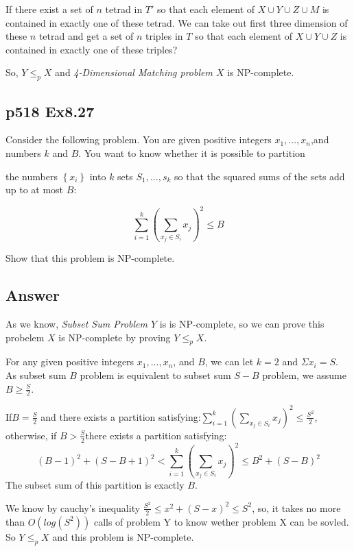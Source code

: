 \documentclass[a4paper]{article}
\begin{document}
If there exist a set of $n$ tetrad in $T'$ so that each element of $X \cup Y \cup Z \cup M$ is contained in exactly one of these tetrad. We can take out first three dimension of these $n$ tetrad and get a set of $n$ triples in $T$ so that each element of $X \cup Y \cup Z$ is contained in exactly one of these triples?

So, $Y\leq_pX$ and \emph{4-Dimensional Matching problem $X$} is NP-complete.
\vspace{2cm}


\subsection*{p518 Ex8.27}
\begin{adjustwidth}{1cm}{1cm}
	Consider the following problem. You are given positive integers $x_1, . . . , x_n$,and numbers $k$ and $B$. You want to know whether it is possible to partition

	the numbers $\left\{x_{i}\right\}$ into $k$ sets $S_{1}, \ldots, s_{k}$ so that the squared sums of the sets add up to at most $B:$

	$$
		\sum_{i=1}^{k}\left(\sum_{x_{j} \in S_{i}} x_{j}\right)^{2} \leq B
	$$

	Show that this problem is NP-complete.
\end{adjustwidth}
\subsection*{Answer}
As we know, \emph{Subset Sum Problem $Y$} is is NP-complete, so we can prove this probelem $X$ is NP-complete by proving $Y\leq_pX$.

For any given positive integers $x_1, . . . , x_n$, and $B$, we can let $k=2$ and $\Sigma x_i = S$. As subset sum $B$ problem is equivalent to subset sum $S-B$ problem, we assume $B \geq \frac{S}{2}$.

If$B = \frac{S}{2}$ and there exists a partition satisfying:$\sum_{i=1}^{k}\left(\sum_{x_{j} \in S_{i}} x_{j}\right)^{2} \leq \frac{S^2}{2}$, otherwise, if $B > \frac{S}{2}$there exists a partition satisfying:
$$
	(B-1)^2 + (S-B+1)^2 < \sum_{i=1}^{k}\left(\sum_{x_{j} \in S_{i}} x_{j}\right)^{2} \leq B^2+(S-B)^2
$$
The subset sum of this partition is exactly $B$.

We know by cauchy's inequality $\frac{S^2}{2} \leq x^2+(S-x)^2 \leq S^2$, so, it takes no more than $O(log(S^2))$ calls of problem Y to know wether problem X can be sovled. So $Y\leq_pX$ and this problem is NP-complete.
\vspace{2cm}
\end{document}
